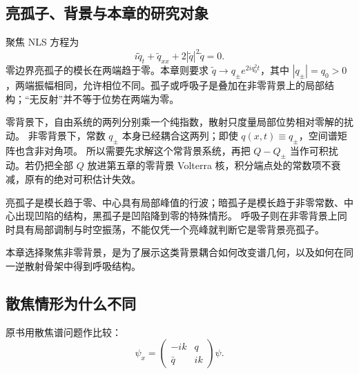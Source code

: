 \documentclass[lang=cn,scheme=chinese,mode=simple,device=normal,color=blue,
math=cm,thmcnt=section,12pt]{elegantbook}
\newcommand{\eqq}[2]{\tag{#1}\label{eq:#1}#2}
\begin{document}
\subsection{亮孤子、背景与本章的研究对象}
聚焦 NLS 方程为
\begin{equation}
    \eqq{6.1.1}{i\widetilde q_t+\widetilde q_{xx}+2|\widetilde q|^2\widetilde q=0.}
\end{equation}
零边界亮孤子的模长在两端趋于零。本章则要求 $\widetilde q\to q_\pm e^{2iq_0^2t}$，其中 $|q_\pm|=q_0>0$，两端振幅相同，允许相位不同。孤子或呼吸子是叠加在非零背景上的局部结构；“无反射”并不等于位势在两端为零。





\begin{callout}
    零背景下，自由系统的两列分别乘一个纯指数，散射只度量局部位势相对零解的扰动。
    非零背景下，常数 $q_\pm$ 本身已经耦合这两列；即使 $q(x,t)\equiv q_\pm$，空间谱矩阵也含非对角项。
    所以需要先求解这个常背景系统，再把 $Q-Q_\pm$ 当作可积扰动。若仍把全部 $Q$ 放进第五章的零背景 Volterra 核，积分端点处的常数项不衰减，原有的绝对可积估计失效。

    亮孤子是模长趋于零、中心具有局部峰值的行波；暗孤子是模长趋于非零常数、中心出现凹陷的结构，黑孤子是凹陷降到零的特殊情形。
    呼吸子则在非零背景上同时具有局部调制与时空振荡，不能仅凭一个亮峰就判断它是零背景亮孤子。

    本章选择聚焦非零背景，是为了展示这类背景耦合如何改变谱几何，以及如何在同一逆散射骨架中得到呼吸结构。
\end{callout}

\subsection{散焦情形为什么不同}
原书用散焦谱问题作比较：
\begin{equation}
    \eqq{6.1.2}{\psi_x=
        \begin{pmatrix}-ik&q\\\bar q&ik\end{pmatrix}\psi.}
\end{equation}
\end{document}
